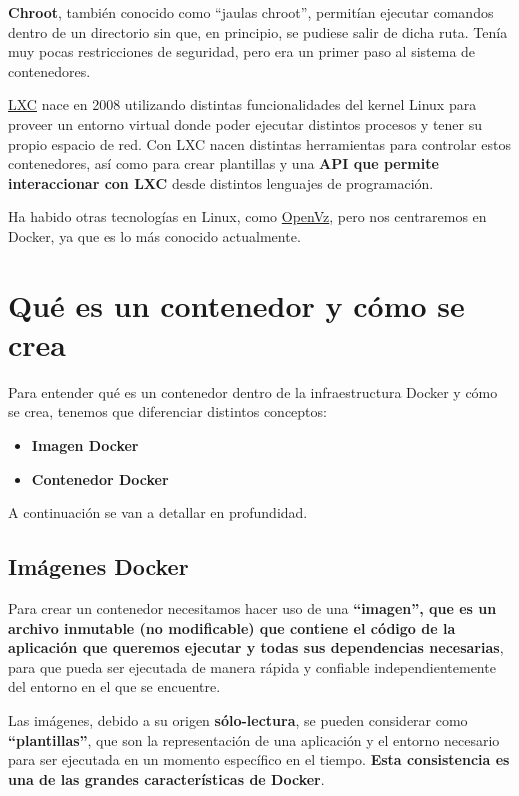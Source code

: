 \textbf{Chroot}, también conocido como “jaulas chroot”, permitían ejecutar comandos dentro de un directorio sin que, en principio, se pudiese salir de dicha ruta. Tenía muy pocas restricciones de seguridad, pero era un primer paso al sistema de contenedores.

\href{https://es.wikipedia.org/wiki/LXC}{LXC} nace en 2008 utilizando distintas funcionalidades del kernel Linux para proveer un entorno virtual donde poder ejecutar distintos procesos y tener su propio espacio de red. Con LXC nacen distintas herramientas para controlar estos contenedores, así como para crear plantillas y una \textbf{API que permite interaccionar con LXC} desde distintos lenguajes de programación.

Ha habido otras tecnologías en Linux, como \href{https://es.wikipedia.org/wiki/OpenVZ}{OpenVz}, pero nos centraremos en Docker, ya que es lo más conocido actualmente.


\section{Qué es un contenedor y cómo se crea}

Para entender qué es un contenedor dentro de la infraestructura Docker y cómo se crea, tenemos que diferenciar distintos conceptos:
\begin{itemize}
    \item \textbf{Imagen Docker}
    \item \textbf{Contenedor Docker}
\end{itemize}

A continuación se van a detallar en profundidad.

\subsection{Imágenes Docker}

Para crear un contenedor necesitamos hacer uso de una \textbf{“imagen”, que es un archivo inmutable (no modificable) que contiene el código de la aplicación que queremos ejecutar y todas sus dependencias necesarias}, para que pueda ser ejecutada de manera rápida y confiable independientemente del entorno en el que se encuentre.

Las imágenes, debido a su origen \textbf{sólo-lectura}, se pueden considerar como \textbf{“plantillas”}, que son la representación de una aplicación y el entorno necesario para ser ejecutada en un momento específico en el tiempo. \textbf{Esta consistencia es una de las grandes características de Docker}.

